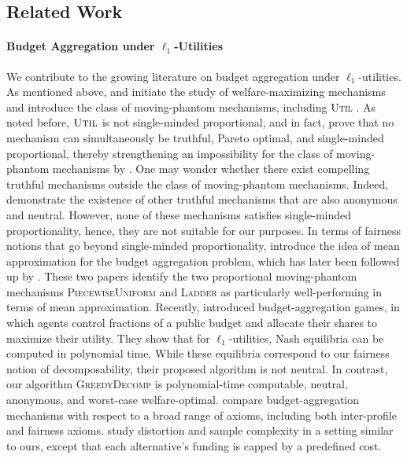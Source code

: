 \documentclass[11pt]{article}
\newcommand{\Ladder}{\textsc{Ladder} }
\newcommand{\PiecewiseUniform}{\textsc{PiecewiseUniform} }
\newcommand{\Ut}{\textsc{Util} }
\newcommand{\GrdDec}{\textsc{GreedyDecomp} }
\begin{document}
\subsection{Related Work}

\paragraph{Budget Aggregation under $\ell_1$-Utilities} We contribute to the growing literature on budget aggregation under $\ell_1$-utilities. As mentioned above, \citet{lindner2008midpoint} and \citet{goel2019knapsack} initiate the study of welfare-maximizing mechanisms and \citet{freeman2021truthful} introduce the class of moving-phantom mechanisms, including \Ut. As noted before, $\Ut$ is not single-minded proportional, and in fact, \citet{brandt2024optimal} prove that no mechanism can simultaneously be truthful, Pareto optimal, and single-minded proportional, thereby strengthening an impossibility for the class of moving-phantom mechanisms by \citet{freeman2021truthful}. One may wonder whether there exist compelling truthful mechanisms outside the class of moving-phantom mechanisms. Indeed, \citet{berg2024truthful} demonstrate the existence of other truthful mechanisms that are also anonymous and neutral. However, none of these mechanisms satisfies single-minded proportionality, hence, they are not suitable for our purposes. In terms of fairness notions that go beyond single-minded proportionality, \citet{caragiannis2022truthful} introduce the idea of mean approximation for the budget aggregation problem, which has later been followed up by \citet{freeman2024project}. These two papers identify the two proportional moving-phantom mechanisms \PiecewiseUniform and \Ladder as particularly well-performing in terms of mean approximation. Recently, \citet{becker2025efficiently} introduced budget-aggregation games, in which agents control fractions of a public budget and allocate their shares to maximize their utility. They show that for $\ell_1$-utilities, Nash equilibria can be computed in polynomial time. While these equilibria correspond to our fairness notion of decomposability, their proposed algorithm is not neutral. In contrast, our algorithm \GrdDec is polynomial-time computable, neutral,  anonymous, and worst-case welfare-optimal. %
\citet{elkind2026settling} compare budget-aggregation mechanisms with respect to a broad range of axioms, including both inter-profile and fairness axioms. \citet{goyal2023low} study distortion and sample complexity in a setting similar to ours, except that each alternative’s funding is capped by a predefined cost.
\end{document}
